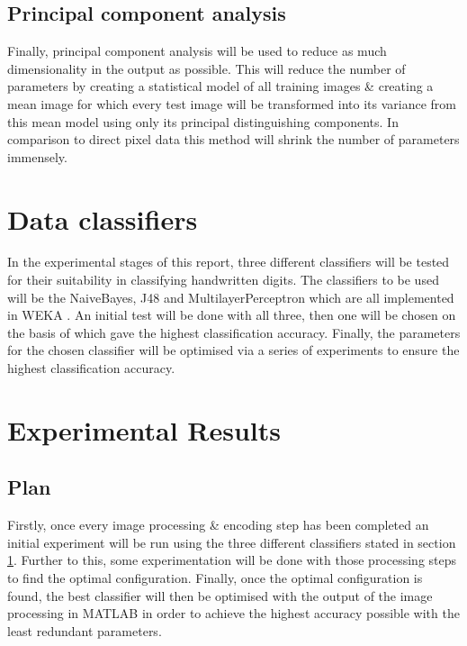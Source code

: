 \documentclass[12pt]{article}
\begin{document}
  \subsection{Principal component analysis} \label{pca}
    Finally, principal component analysis \citep{pearson1901liii} will be used to reduce as much dimensionality in the output as possible. This will reduce the number of parameters by creating a statistical model of all training images \& creating a mean image for which every test image will be transformed into its variance from this mean model using only its principal distinguishing components. In comparison to direct pixel data this method will shrink the number of parameters immensely.

\section{Data classifiers} \label{classifiers}
  In the experimental stages of this report, three different classifiers will be tested for their suitability in classifying handwritten digits. The classifiers to be used will be the NaiveBayes, J48 and MultilayerPerceptron which are all implemented in WEKA \citep{hall2009weka}. An initial test will be done with all three, then one will be chosen on the basis of which gave the highest classification accuracy. Finally, the parameters for the chosen classifier will be optimised via a series of experiments to ensure the highest classification accuracy.

\section{Experimental Results}
  \subsection{Plan}
    Firstly, once every image processing \& encoding step has been completed an initial experiment will be run using the three different classifiers stated in section \ref{classifiers}. Further to this, some experimentation will be done with those processing steps to find the optimal configuration. Finally, once the optimal configuration is found, the best classifier will then be optimised with the output of the image processing in MATLAB in order to achieve the highest accuracy possible with the least redundant parameters.
\end{document}
